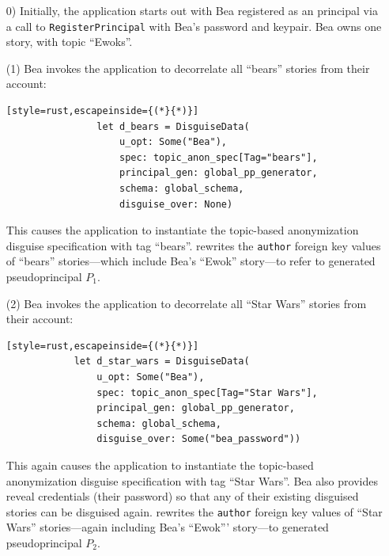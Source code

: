\begin{enumerate}[nosep]
    \item[0)] Initially, the application starts out with Bea registered as an
        \sys principal via a call to \texttt{RegisterPrincipal} with Bea's
        password and keypair. Bea owns one story, with topic ``Ewoks''.

    \item[(1)] Bea invokes the application to decorrelate all ``bears'' stories 
        from their account: 

            \vspace{12pt}
            \begin{lstlisting}[style=rust,escapeinside={(*}{*)}]
                let d_bears = DisguiseData(
                    u_opt: Some("Bea"), 
                    spec: topic_anon_spec[Tag="bears"],
                    principal_gen: global_pp_generator,
                    schema: global_schema,
                    disguise_over: None)
            \end{lstlisting}

        This causes the application to instantiate the
        topic-based anonymization disguise specification with tag ``bears''.
        \sys rewrites the \texttt{author} foreign key values of ``bears''
         stories---which include Bea's ``Ewok'' story---to refer to generated
        pseudoprincipal $P_1$.

        \item[(2)] Bea invokes the application to decorrelate all ``Star Wars''
            stories from
        their account: 

        \vspace{12pt}
        \begin{lstlisting}[style=rust,escapeinside={(*}{*)}]
            let d_star_wars = DisguiseData(
                u_opt: Some("Bea"), 
                spec: topic_anon_spec[Tag="Star Wars"],
                principal_gen: global_pp_generator,
                schema: global_schema,
                disguise_over: Some("bea_password"))
        \end{lstlisting}

        This again causes the application to instantiate the topic-based
        anonymization disguise specification with tag ``Star Wars''. Bea also
        provides reveal credentials (\eg their password) so that any of their existing
        disguised stories can be disguised again. \sys rewrites the
        \texttt{author} foreign key values of ``Star Wars'' stories---again
        including Bea's ``Ewok''' story---to generated pseudoprincipal $P_2$.
    

\end{enumerate}
